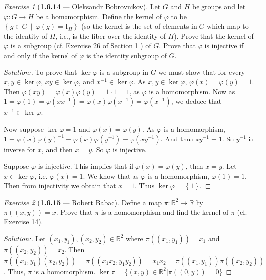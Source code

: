 \documentclass[12pt]{amsart}
\theoremstyle{remark}
\newtheorem*{exercise}{Exercise}%
\theoremstyle{mycomment}
\begin{document}
\begin{exercise}[\textbf{1.6.14} --- Oleksandr Bobrovnikov]
  Let $G$ and $H$ be groups and let $\varphi:G\to H$ be a homomorphism. Define the kernel of $\varphi$ to be $\left\{ g\in G\,\middle\vert\,  \varphi(g)=1_H \right\}$ (so the kernel is the set of elements in $G$ which map to the identity of $H$, i.e., is the fiber over the identity of $H$). Prove that the kernel of $\varphi$ is a subgroup (cf. Exercise 26 of Section 1 ) of $G$. Prove that $\varphi$ is injective if and only if the
  kernel of $\varphi$ is the identity subgroup of $G$.
  \begin{proof}[Solution:]
    To prove that $\ker \varphi$ is a subgroup in $G$ we must show that for every $x,y\in\ker \varphi$, $xy\in\ker\varphi$, and $x^{-1}\in\ker \varphi$. As $x,y\in\ker\varphi$, $\varphi(x)=\varphi(y)=1$.
    Then $\varphi(xy)=\varphi(x)\varphi(y)=1\cdot 1=1$, as $\varphi$ is a homomorphism. Now as
    $1=\varphi(1)=\varphi(xx^{-1})=\varphi(x)\varphi(x^{-1})=\varphi(x^{-1})$, we deduce that $x^{-1}\in\ker\varphi$.

    Now suppose $\ker \varphi =1$ and $\varphi(x)=\varphi(y)$. As $\varphi$ is a homomorphism, $1=\varphi(x)\varphi(y)^{-1}=\varphi(x)\varphi(y^{-1})=\varphi(xy^{-1})$. And thus $xy^{-1}=1$. So $y^{-1}$ is inverse for $x$, and then $x=y$. So $\varphi$ is injective.

    Suppose $\varphi$ is injective. This implies that if $\varphi(x)=\varphi(y)$, then $x=y$. Let $x\in\ker\varphi$, i.e. $\varphi(x)=1$. We know that as $\varphi$ is a homomorphism, $\varphi(1)=1$. Then from injectivity we obtain that $x=1$. Thus $\ker \varphi =\left\{ 1 \right\}$.
  \end{proof}
\end{exercise}
\vspace{.15in}



\begin{exercise}[\textbf{1.6.15} --- Robert Babac]  
  Define a map $\pi:\mathbb R^2\to\mathbb R$ by $\pi((x,y))=x$. Prove that $\pi$ is a homomorphism and find the kernel of $\pi$ (cf. Exercise 14). 
  \begin{proof}[Solution:]
  Let $(x_1,y_1),(x_2,y_2)\in\mathbb R^2$ where $\pi((x_1,y_1))=x_1$ and $\pi((x_2,y_2))=x_2$. Then $\pi((x_1,y_1)(x_2,y_2))=\pi((x_1x_2,y_1y_2))=x_1x_2=\pi((x_1,y_1))\pi((x_2,y_2))$. Thus, $\pi$ is a homomorphism. $\ker\pi=\{(x,y)\in\mathbb R^2|\pi((0,y))=0\}$
  \end{proof}
  \end{exercise}
\vspace{.15in}
\end{document}
